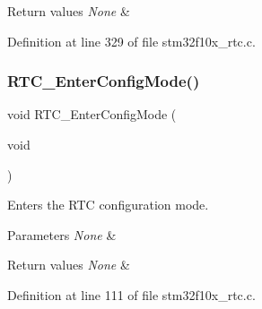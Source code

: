 \begin{DoxyRetVals}{Return values}
{\em None} & \\
\hline
\end{DoxyRetVals}


Definition at line 329 of file stm32f10x\+\_\+rtc.\+c.

\mbox{\label{group___r_t_c___private___functions_ga23612d9da2fe057a0cd72c684e5b438a}} 
\subsubsection{\texorpdfstring{R\+T\+C\+\_\+\+Enter\+Config\+Mode()}{RTC\_EnterConfigMode()}}
{\footnotesize\ttfamily void R\+T\+C\+\_\+\+Enter\+Config\+Mode (\begin{DoxyParamCaption}\item[{void}]{ }\end{DoxyParamCaption})}



Enters the R\+TC configuration mode. 


\begin{DoxyParams}{Parameters}
{\em None} & \\
\hline
\end{DoxyParams}

\begin{DoxyRetVals}{Return values}
{\em None} & \\
\hline
\end{DoxyRetVals}


Definition at line 111 of file stm32f10x\+\_\+rtc.\+c.

